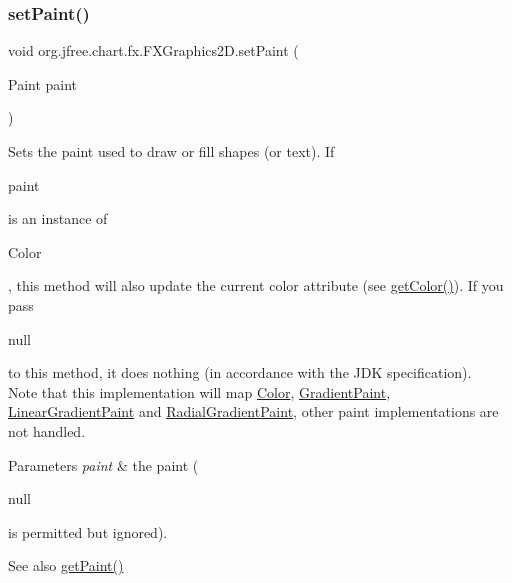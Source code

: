 \subsubsection{\texorpdfstring{set\+Paint()}{setPaint()}}
{\footnotesize\ttfamily void org.\+jfree.\+chart.\+fx.\+F\+X\+Graphics2\+D.\+set\+Paint (\begin{DoxyParamCaption}\item[{Paint}]{paint }\end{DoxyParamCaption})}

Sets the paint used to draw or fill shapes (or text). If 
\begin{DoxyCode}
paint 
\end{DoxyCode}
 is an instance of
\begin{DoxyCode}
Color 
\end{DoxyCode}
 , this method will also update the current color attribute (see \mbox{\hyperlink{classorg_1_1jfree_1_1chart_1_1fx_1_1_f_x_graphics2_d_a5c607df80f641c535f4967ab2bb58d8f}{get\+Color()}}). If you pass
\begin{DoxyCode}
null 
\end{DoxyCode}
 to this method, it does nothing (in accordance with the J\+DK specification). ~\newline
~\newline
 Note that this implementation will map \mbox{\hyperlink{}{Color}}, \mbox{\hyperlink{}{Gradient\+Paint}}, \mbox{\hyperlink{}{Linear\+Gradient\+Paint}} and \mbox{\hyperlink{}{Radial\+Gradient\+Paint}}, other paint implementations are not handled.


\begin{DoxyParams}{Parameters}
{\em paint} & the paint (
\begin{DoxyCode}
null 
\end{DoxyCode}
 is permitted but ignored).\\
\hline
\end{DoxyParams}
\begin{DoxySeeAlso}{See also}
\mbox{\hyperlink{classorg_1_1jfree_1_1chart_1_1fx_1_1_f_x_graphics2_d_a67325fdaf847a6daf0d98da1771f5638}{get\+Paint()}} 
\end{DoxySeeAlso}
\mbox{\label{classorg_1_1jfree_1_1chart_1_1fx_1_1_f_x_graphics2_d_a2c7f883ba59cff913c237188492fb437}} 

